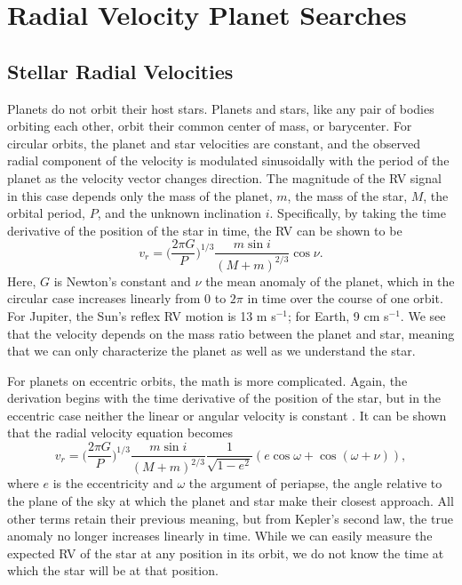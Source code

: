 \section{Radial Velocity Planet Searches}
\subsection{Stellar Radial Velocities}
Planets do not orbit their host stars.
Planets and stars, like any pair of bodies orbiting each other, orbit their common
center of mass, or barycenter.
For circular orbits, the planet and star velocities are constant, and the observed
radial component of the velocity is modulated sinusoidally with the period of the planet
as the velocity vector changes direction.
The magnitude of the RV signal in this case depends only the mass of the planet, $m$, 
the mass of the star, $M$, the orbital period, $P$, and the unknown inclination $i$.
Specifically, by taking the time derivative of the position of the star in time,
the RV can be shown to be
\begin{equation}
v_r = \bigg(\frac{2\pi G}{P}\bigg)^{1/3} \frac{m \sin i}{(M+m)^{2/3}} \cos{\nu}.
\end{equation}
Here, $G$ is Newton's constant and $\nu$ the mean anomaly of the planet, which in the circular case increases
linearly from $0$ to $2\pi$ in time over the course of one orbit.
For Jupiter, the Sun's reflex RV motion is 13 m s$^{-1}$; for Earth, 9 cm s$^{-1}$.
We see that the velocity depends on the mass ratio between the planet and star, meaning
that we can only characterize the planet as well as we understand the star.

For planets on eccentric orbits, the math is more complicated.
Again, the derivation begins with the time derivative of the position of the star, but
in the eccentric case neither the linear or angular velocity is constant \citep{Kepler09}.
It can be shown that the radial velocity equation becomes
\begin{equation}
v_r = \bigg(\frac{2\pi G}{P}\bigg)^{1/3} \frac{m \sin i}{(M+m)^{2/3}} \frac{1}{\sqrt{1-e^2}}
(e \cos \omega + \cos(\omega + \nu)),
\label{eq:rv}
\end{equation}
where $e$ is the eccentricity and $\omega$ the argument of periapse, the angle relative
to the plane of the sky at which the planet and star make their closest approach.
All other terms retain their previous meaning, but from Kepler's second law, the true anomaly 
no longer increases linearly in time.
While we can easily measure the expected RV of the star at any position in its 
orbit, we do not know the time at which the star will be at that position.

